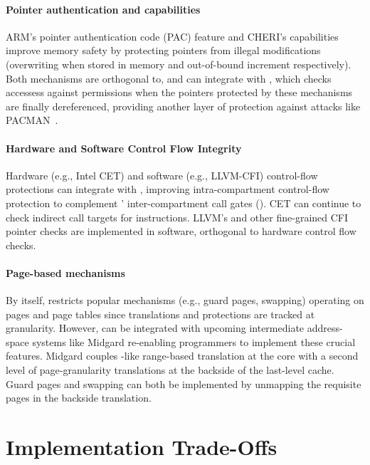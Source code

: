 \paragraph{Pointer authentication and capabilities}
ARM's pointer authentication code (PAC) feature and CHERI's capabilities
improve memory safety by protecting pointers from illegal 
modifications (overwriting when stored in memory and out-of-bound
increment respectively). Both mechanisms are orthogonal to,
and can integrate with \seccells, which checks accessess against \ptable
permissions when the 
pointers protected by these mechanisms are finally dereferenced, providing
another layer of protection against attacks like PACMAN~\cite{pacmanRavichandranNLY22}.

\paragraph{Hardware and Software Control Flow Integrity}
Hardware (e.g., Intel CET) and software (e.g., LLVM-CFI) control-flow
protections can integrate with \seccells, 
improving intra-compartment control-flow protection to
complement \seccells' inter-compartment call gates (\sdentry).
CET can continue to check indirect call targets for  instructions. 
LLVM's and other fine-grained CFI pointer checks are implemented in software, 
orthogonal to hardware control flow checks.


\paragraph{Page-based mechanisms}
By itself, \seccells restricts popular mechanisms (e.g., guard pages, swapping)
operating on pages and page tables since translations and protections are 
tracked at \cell granularity.
However, \seccells can be integrated with upcoming intermediate address-space 
systems like Midgard re-enabling programmers to implement these crucial 
features.
Midgard couples \seccells-like range-based translation at the core with
a second level of page-granularity translations at the backside of the 
last-level cache.
Guard pages and swapping can both be implemented by unmapping the requisite pages 
in the backside translation.


\section{\seccells Implementation Trade-Offs}
\label{app:seccells:impl_options}

